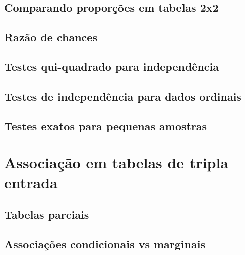 \documentclass[]{book}
\begin{document}
\hypertarget{comparando-proporcoes-em-tabelas-2x2}{%
\section{Comparando proporções em tabelas 2x2}\label{comparando-proporcoes-em-tabelas-2x2}}

\hypertarget{razao-de-chances}{%
\section{Razão de chances}\label{razao-de-chances}}

\hypertarget{testes-qui-quadrado-para-independencia}{%
\section{Testes qui-quadrado para independência}\label{testes-qui-quadrado-para-independencia}}

\hypertarget{testes-de-independencia-para-dados-ordinais}{%
\section{Testes de independência para dados ordinais}\label{testes-de-independencia-para-dados-ordinais}}

\hypertarget{testes-exatos-para-pequenas-amostras}{%
\section{Testes exatos para pequenas amostras}\label{testes-exatos-para-pequenas-amostras}}

\hypertarget{associacao-em-tabelas-de-tripla-entrada}{%
\chapter{Associação em tabelas de tripla entrada}\label{associacao-em-tabelas-de-tripla-entrada}}

\hypertarget{tabelas-parciais}{%
\section{Tabelas parciais}\label{tabelas-parciais}}

\hypertarget{associacoes-condicionais-vs-marginais}{%
\section{Associações condicionais vs marginais}\label{associacoes-condicionais-vs-marginais}}
\end{document}

